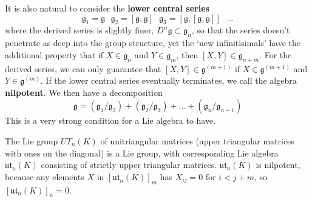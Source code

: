 It is also natural to consider the {\bf lower central series}
%
\[ \mathfrak{g}_1 = \mathfrak{g}\ \ \  \mathfrak{g}_2 = [\mathfrak{g}, \mathfrak{g}]\ \ \ \mathfrak{g}_3 = [\mathfrak{g}, [\mathfrak{g}, \mathfrak{g}]]\ \ \  \dots \]
%
where the derived series is slightly finer, $D^n \mathfrak{g} \subset \mathfrak{g}_n$, so that the series doesn't penetrate as deep into the group structure, yet the `new infinitisimals' have the additional property that if $X \in \mathfrak{g}_n$ and $Y \in \mathfrak{g}_m$, then $[X,Y] \in \mathfrak{g}_{n+m}$. For the derived series, we can only guarantee that $[X,Y] \in \mathfrak{g}^{(m+1)}$ if $X \in \mathfrak{g}^{(m+1)}$ and $Y \in \mathfrak{g}^{(m)}$. If the lower central series eventually terminates, we call the algebra {\bf nilpotent}. We then have a decomposition
%
\[ \mathfrak{g} = (\mathfrak{g}_1/\mathfrak{g}_2) + (\mathfrak{g}_2/\mathfrak{g}_3) + \dots + (\mathfrak{g}_n/\mathfrak{g}_{n+1}) \]
%
This is a very strong condition for a Lie algebra to have.

\begin{example}
    The Lie group $UT_n(K)$ of unitriangular matrices (upper triangular matrices with ones on the diagonal) is a Lie group, with corresponding Lie algebra $\mathfrak{ut}_n(K)$ consisting of strictly upper triangular matrices. $\mathfrak{ut}_n(K)$ is nilpotent, because any elements $X$ in $[\mathfrak{ut}_n(K)]_m$ has $X_{ij} = 0$ for $i < j + m$, so $[\mathfrak{ut}_n(K)]_n = 0$.
\end{example}

